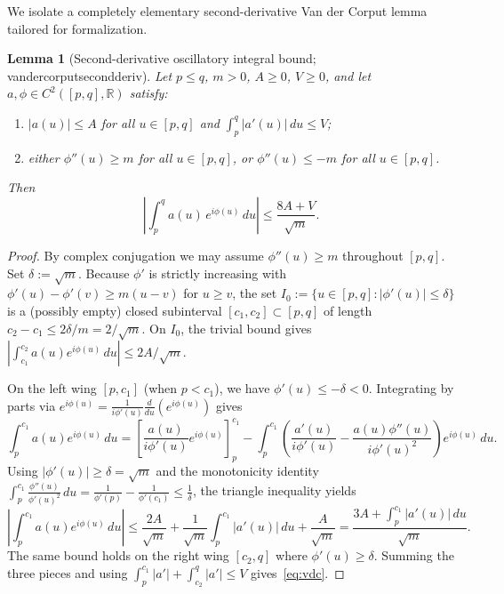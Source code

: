 \documentclass[11pt,reqno]{amsart}
\numberwithin{equation}{section}
\newtheorem{lemma}[theorem]{Lemma}
\theoremstyle{definition}
\newcommand{\R}{\mathbb{R}}
\newcommand{\1}{\mathbf{1}}
\newcommand{\lean}[1]{{\footnotesize\ttfamily\renewcommand{\_}{\textunderscore\allowbreak}#1}}
\begin{document}
We isolate a completely elementary second-derivative Van der Corput lemma tailored for formalization.

\begin{lemma}[Second-derivative oscillatory integral bound; \lean{van\_der\_corput\_second\_deriv}]
\label{lem:vdc}
Let $p \le q$, $m > 0$, $A \ge 0$, $V \ge 0$, and let $a, \phi \in C^2([p, q], \R)$ satisfy:
\begin{enumerate}[label=(\roman*)]
  \item $|a(u)| \le A$ for all $u \in [p, q]$ and $\int_p^q |a'(u)|\,du \le V$;
  \item either $\phi''(u) \ge m$ for all $u \in [p, q]$, or $\phi''(u) \le -m$ for all $u \in [p, q]$.
\end{enumerate}
Then
\begin{equation}\label{eq:vdc}
  \left|\int_p^q a(u)\, e^{i\phi(u)}\,du\right| \le \frac{8 A + V}{\sqrt{m}}.
\end{equation}
\end{lemma}

\begin{proof}
By complex conjugation we may assume $\phi''(u) \ge m$ throughout $[p, q]$. Set $\delta := \sqrt{m}$. Because $\phi'$ is strictly increasing with $\phi'(u) - \phi'(v) \ge m(u - v)$ for $u \ge v$, the set $I_0 := \{u \in [p, q] : |\phi'(u)| \le \delta\}$ is a (possibly empty) closed subinterval $[c_1, c_2] \subset [p, q]$ of length $c_2 - c_1 \le 2\delta/m = 2/\sqrt{m}$. On $I_0$, the trivial bound gives $\left|\int_{c_1}^{c_2} a(u)e^{i\phi(u)}\,du\right| \le 2 A / \sqrt{m}$.

On the left wing $[p, c_1]$ (when $p < c_1$), we have $\phi'(u) \le -\delta < 0$. Integrating by parts via $e^{i\phi(u)} = \frac{1}{i\phi'(u)}\frac{d}{du}(e^{i\phi(u)})$ gives
\[
  \int_p^{c_1} a(u) e^{i\phi(u)}\,du
  = \left[\frac{a(u)}{i\phi'(u)}e^{i\phi(u)}\right]_p^{c_1}
    - \int_p^{c_1} \left(\frac{a'(u)}{i\phi'(u)} - \frac{a(u)\phi''(u)}{i\phi'(u)^2}\right) e^{i\phi(u)}\,du.
\]
Using $|\phi'(u)| \ge \delta = \sqrt{m}$ and the monotonicity identity $\int_p^{c_1} \frac{\phi''(u)}{\phi'(u)^2}\,du = \frac{1}{\phi'(p)} - \frac{1}{\phi'(c_1)} \le \frac{1}{\delta}$, the triangle inequality yields
\[
  \left|\int_p^{c_1} a(u) e^{i\phi(u)}\,du\right|
  \le \frac{2A}{\sqrt{m}} + \frac{1}{\sqrt{m}}\int_p^{c_1} |a'(u)|\,du + \frac{A}{\sqrt{m}}
  = \frac{3A + \int_p^{c_1}|a'(u)|\,du}{\sqrt{m}}.
\]
The same bound holds on the right wing $[c_2, q]$ where $\phi'(u) \ge \delta$. Summing the three pieces and using $\int_p^{c_1}|a'| + \int_{c_2}^q |a'| \le V$ gives~\eqref{eq:vdc}.
\end{proof}
\end{document}
